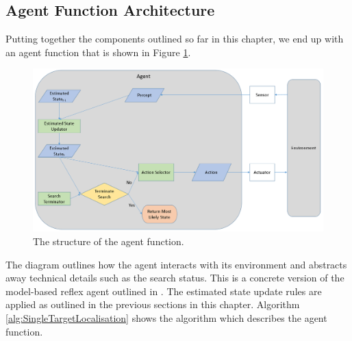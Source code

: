 \subsection{Agent Function Architecture}\label{subsec:AgentFNArch}
Putting together the components outlined so far in this chapter, we end up with an agent function that is shown in Figure \ref{fig:BasicAgentArchitecture}. 

\begin{figure}
    \centering
    \includegraphics[width = 0.75\linewidth]{Chapters/MultiAgentTargetDetection/Figs/AgentFnArchitecture/BasicAgentFunctionNoCommunication.PNG}
    \caption{The structure of the agent function.}
    \label{fig:BasicAgentArchitecture}
\end{figure}


The diagram outlines how the agent interacts with its environment and abstracts away technical details such as the search status. This is a concrete version of the model-based reflex agent outlined in \cite[P~.51]{AIAMA}. The estimated state update rules are applied as outlined in the previous sections in this chapter. Algorithm \ref{alg:SingleTargetLocalisation} shows the algorithm which describes the agent function.



